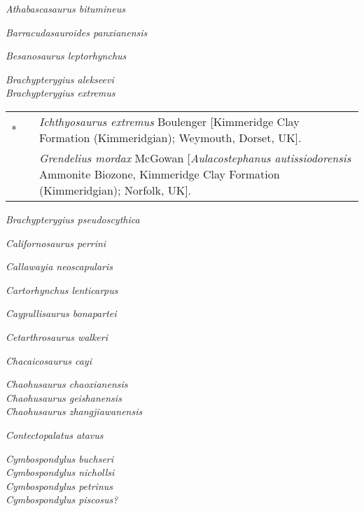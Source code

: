 \documentclass[notuftebib,font=erewhon]{tufte-lualatex}
\newenvironment*{synonymy}%
	{
		\footnotesize
		\begin{tabu}[l]{rlX}
	}%
	{
		\\
		\end{tabu}
		\normalsize
	}
\begin{document}
\emph{Athabascasaurus bitumineus}
    \cite*[Druckenmiller \& Maxwell,][]{Druckenmiller2010CJES}

\emph{Barracudasauroides panxianensis}
    \parencite*[Jiang et al.,][]{Jiang2006JVP}

\emph{Besanosaurus leptorhynchus}
    \cite*[Dal Sasso \& Pinna,][]{DalSasso1996PL}

\emph{Brachypterygius alekseevi}
    \parencite*[Arkhangelsky,][]{Arkhangelsky2001PJ}\\
\emph{Brachypterygius extremus}
    \parencite*[Boulenger,][]{Boulenger1904PZSL}\\
\begin{synonymy}
	*	&	\cite*{Boulenger1904PZSL}	&	\emph{Ichthyosaurus extremus} Boulenger [Kimmeridge Clay Formation (Kimmeridgian); Weymouth, Dorset, UK]. \\
		&	\cite*{McGowan1976CJES}	&	\emph{Grendelius mordax} McGowan [\emph{Aulacostephanus autissiodorensis} Ammonite Biozone, Kimmeridge Clay Formation (Kimmeridgian); Norfolk, UK].
\end{synonymy}
\emph{Brachypterygius pseudoscythica}
    \parencite*[Efimov,][]{Efimov1998PZ}

\emph{Californosaurus perrini}
    \parencite*[Merriam,][]{Merriam1902UCBDG}

\emph{Callawayia neoscapularis} \parencite*[McGowan,][]{McGowan1994JVPa}

\emph{Cartorhynchus lenticarpus} \cite*[Motani et al.,][]{Motani2015N}

\emph{Caypullisaurus bonapartei} \cite*[Fernández,][]{Fernandez1997JP}

\emph{Cetarthrosaurus walkeri} \cite*[Seeley,][]{Seeley1873QJGS}

\emph{Chacaicosaurus cayi} \cite*[Fernández,][]{Fernandez1994A}

\emph{Chaohusaurus chaoxianensis} \parencite*[Chen,][]{Chen1985RGC}\\
\emph{Chaohusaurus geishanensis} \cite*[Young \& Dong,][]{Young1972MNIGP}\\
\emph{Chaohusaurus zhangjiawanensis} \cite*[Chen et al.,][]{Chen2013AGS}

\emph{Contectopalatus atavus} \parencite*[Quenstedt,][]{Quenstedt1852}

\emph{Cymbospondylus buchseri} \cite*[Sander,][]{Sander1989JVP}\\
\emph{Cymbospondylus nichollsi} \cite*[Fröbisch et al.,][]{Frobisch2006ZJLS}\\
\emph{Cymbospondylus petrinus} \cite*[Leidy,][]{Leidy1868PANSP}\\
\emph{Cymbospondylus piscosus?} \cite*[Leidy,][]{Leidy1868PANSP}
\end{document}
